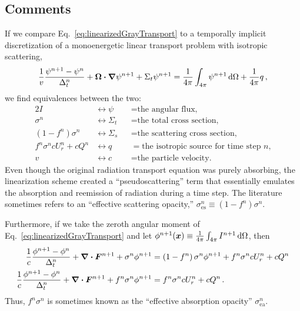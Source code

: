 \subsection{Comments}\label{sec:trtLinearizedComments}
If we compare Eq.~\eqref{eq:linearizedGrayTransport} to a temporally implicit
discretization of a monoenergetic linear transport problem with isotropic
scattering,
\begin{equation*}
  \frac{1}{v} \frac{\psi^{n+1} - \psi^n}{\Delta_t^n} 
  + \bm{\Omega} \bm{\cdot} \bm{\nabla} \psi^{n+1}
 + \Sigma_t \psi^{n+1}
 = \frac{1}{4\pi} \int_{4\pi} \psi^{n+1}\mathop{}\!\mathrm{d} \Omega
  + \frac{1}{4\pi} q \,,
\end{equation*}
we find equivalences between the two:
\begin{alignat*}{2}
  I &\leftrightarrow \psi &&= \text{the angular flux,}
  \\
  \sigma^n &\leftrightarrow \Sigma_t &&= \text{the total cross section,}
  \\
  \left(1 - f^n\right) \sigma^n &\leftrightarrow \Sigma_s &&= \text{the scattering cross
  section,} 
  \\
  f^n \sigma^n c U_r^n + c Q^n &\leftrightarrow q &&= \text{the isotropic source for time
  step $n$,}
  \\
  v   &\leftrightarrow c &&= \text{the particle velocity.}
\end{alignat*}
Even though the original radiation transport equation was purely
absorbing, the linearization scheme created a ``pseudoscattering''
term that essentially emulates the absorption and reemission of
radiation during a time step. The literature sometimes refers to an
``effective scattering opacity,''
$\sigma_\text{es}^n \equiv \left(1 - f^n\right) \sigma^n$.

Furthermore, if we take the zeroth angular moment of
Eq.~\eqref{eq:linearizedGrayTransport} and let $\phi^{n+1}(\bm{x}) \equiv
\frac{1}{4\pi} \int_{4\pi} I^{n+1}\mathop{}\!\mathrm{d} \Omega$, then
\begin{align*}
  \frac{1}{c} \frac{\phi^{n+1} - \phi^n}{\Delta_t^n}
  + \bm{\nabla} \bm{\cdot} \bm{F}^{n+1}
 + \sigma^n \phi^{n+1}
 &=  \left(1 - f^n\right) \sigma^n \phi^{n+1} +f^n \sigma^n c U_r^n
  + c Q^n
  \\
  \frac{1}{c} \frac{\phi^{n+1} - \phi^n}{\Delta_t^n}
  + \bm{\nabla} \bm{\cdot} \bm{F}^{n+1} + f^n\sigma^n \phi^{n+1}
 &=  f^n \sigma^n c U_r^n + c Q^n\,.
\end{align*}
Thus, $f^n\sigma^n$ is sometimes known as the ``effective absorption opacity''
$\sigma_\text{ea}^n$.

